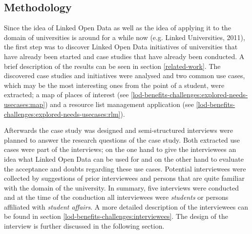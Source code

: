 \documentclass{article}
\begin{document}
\subsection{Methodology}
\label{lod-benefits-challenges:methodology}
Since the idea of Linked Open Data as well as the idea of applying it to the domain of universities is around for a while now (e.g. Linked Universities, 2011), the first step was to discover Linked Open Data initiatives of universities that have already been started and case studies that have already been conducted. A brief description of the results can be seen in section \ref{related-work}. The discovered case studies and initiatives were analysed and two common use cases, which may be the most interesting ones from the point of a student, were extracted; a map of places of interest (see \ref{lod-benefits-challenges:explored-needs-usecases:map}) and a resource list management application (see \ref{lod-benefits-challenges:explored-needs-usecases:rlm}). 

Afterwards the case study was designed and semi-structured interviews were planned to answer the research questions of the case study. Both extracted use cases were part of the interviews; on the one hand to give the interviewees an idea what Linked Open Data can be used for and on the other hand to evaluate the acceptance and doubts regarding these use cases. Potential interviewees were collected by suggestions of prior interviewees and persons that are quite familiar with the domain of the university. In summary, five interviews were conducted and at the time of the conduction all interviewees were \textit{students} or persons affiliated with \textit{student affairs}. A more detailed description of the interviewees can be found in section \ref{lod-benefits-challenges:interviewees}. The design of the interview is further discussed in the following section.
\end{document}

